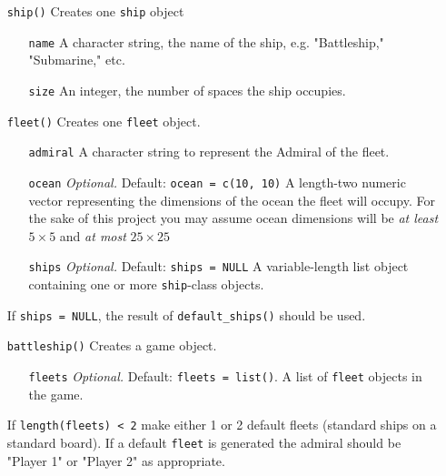 \documentclass[
]{article}
\begin{document}
\begin{itemize}
  \item[\texttt{ship()}] Creates one \texttt{ship} object
    \begin{itemize}
      \item[\texttt{name}] A character string, the name of the ship, e.g. "Battleship," "Submarine," etc.
      \item[\texttt{size}] An integer, the number of spaces the ship occupies.
    \end{itemize}
  \item[\texttt{fleet()}] Creates one \texttt{fleet} object.
    \begin{itemize}
      \item[\texttt{admiral}] A character string to represent the Admiral of the fleet.
      \item[\texttt{ocean}] \emph{Optional.} Default: \texttt{ocean = c(10, 10)} A length-two numeric vector representing the dimensions of the ocean the fleet will occupy. For the sake of this project you may assume ocean dimensions will be \emph{at least} \(5\times 5\) and \emph{at most} \(25\times 25\)
      \item[\texttt{ships}] \emph{Optional.} Default: \texttt{ships = NULL} A variable-length list object containing one or more \texttt{ship}-class objects.
    \end{itemize}
    If \texttt{ships = NULL}, the result of \texttt{default\_ships()} should be used.
  \item[\texttt{battleship()}] Creates a game object.
    \begin{itemize}
      \item[\texttt{fleets}] \emph{Optional.} Default: \texttt{fleets = list()}. A list of \texttt{fleet} objects in the game.
    \end{itemize}
    If \texttt{length(fleets) < 2} make either 1 or 2 default fleets (standard ships on a standard board). If a default \texttt{fleet} is generated the admiral should be "Player 1" or "Player 2" as appropriate.
\end{itemize}
\end{document}
